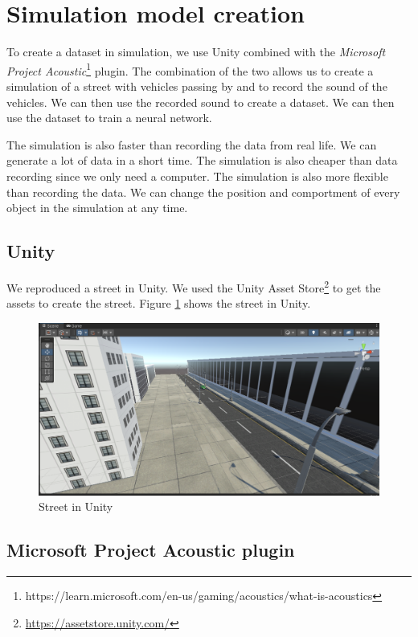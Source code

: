 \section{Simulation model creation}

To create a dataset in simulation, we use Unity combined with the \textit{Microsoft Project Acoustic}\footnote{https://learn.microsoft.com/en-us/gaming/acoustics/what-is-acoustics} plugin. The combination of the two allows us to create a simulation of a street with vehicles passing by and to record the sound of the vehicles. We can then use the recorded sound to create a dataset. We can then use the dataset to train a neural network.

The simulation is also faster than recording the data from real life. We can generate a lot of data in a short time. The simulation is also cheaper than data recording since we only need a computer. The simulation is also more flexible than recording the data. We can change the position and comportment of every object in the simulation at any time.

\subsection{Unity}

We reproduced a street in Unity. We used the Unity Asset Store\footnote{\url{https://assetstore.unity.com/}} to get the assets to create the street. Figure \ref{fig:simulation_modelization} shows the street in Unity.

\begin{figure}[H]
    \centering
    \includegraphics[width=.8\textwidth]{images/simulation_modelization.png}
    \caption{Street in Unity}
    \label{fig:simulation_modelization}
\end{figure}

\subsection{Microsoft Project Acoustic plugin}

